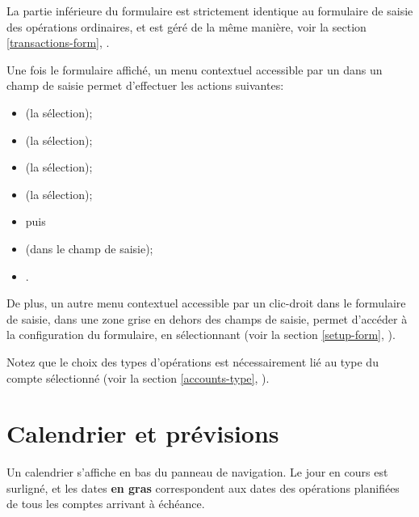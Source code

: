 La partie inférieure du formulaire est strictement identique au formulaire de saisie des opérations ordinaires, et est géré de la même manière, voir la section \vref{transactions-form}, .

Une fois le formulaire affiché, un menu contextuel accessible par un  dans un champ de saisie permet d'effectuer les actions suivantes:

\begin{itemize}
	\item {} (la sélection);
	\item {} (la sélection);
	\item {} (la sélection);
	\item {} (la sélection);
	\item[]\hspace{-12pt} puis
	\item {} (dans le champ de saisie);
	\item {}.
\end{itemize}

De plus, un autre menu contextuel accessible par un clic-droit dans le formulaire de saisie, dans une zone grise en dehors des champs de saisie, permet d'accéder à la configuration du formulaire, en sélectionnant  (voir la section \vref{setup-form}, ).

Notez que le choix des types d'opérations est nécessairement lié au type du compte sélectionné (voir la section \vref{accounts-type}, ).


\section{Calendrier et prévisions\label{plannedtransactions-calendar}}

Un calendrier s'affiche en bas du panneau de navigation. Le jour en cours est \colorbox[RGB]{198,200,201}{surligné}, et les dates \textbf{en gras} correspondent aux dates des opérations planifiées de tous les comptes arrivant à échéance.

